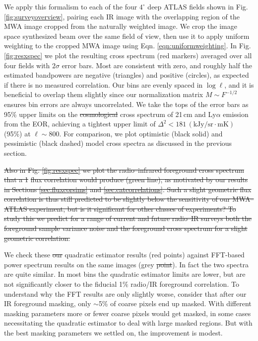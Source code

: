 \documentclass[numberedappendix]{emulateapj}
\providecommand{\DIFadd}[1]{{\protect\color{blue}\uwave{#1}}} %
\providecommand{\DIFdel}[1]{{\protect\color{red}\sout{#1}}}                      %
\providecommand{\DIFaddbegin}{} %
\providecommand{\DIFaddend}{} %
\providecommand{\DIFdelbegin}{} %
\providecommand{\DIFdelend}{} %
\begin{document}
We apply this formalism to each of the four $4^\circ$ deep ATLAS fields shown in Fig. \ref{fig:surveyoverview}, pairing each IR image with the overlapping region of the MWA image cropped from the naturally weighted image. We crop the image space synthesized beam over the same field of view, then use it to apply uniform weighting to the cropped MWA image using Eqn. \ref{eqn:uniformweighting}. In Fig. \ref{fig:resxspec} we plot the resulting cross spectrum (red markers) averaged over all four fields with $2\sigma$ error bars. Most are consistent with zero, and roughly half the estimated bandpowers are negative (triangles) and positive (circles), as expected if there is no measured correlation. Our bins are evenly spaced in $\log \ell$, and it is beneficial to overlap them slightly since our normalization matrix $M\sim F^{-1/2}$ ensures bin errors are always uncorrelated. We take the tops of the error bars as 95\% upper limits on the \DIFdelbegin \DIFdel{cosmological }\DIFdelend cross spectrum of \DIFaddbegin \DIFadd{residual foregrounds of  }\DIFaddend 21\,cm and Ly$\alpha$ emission from the EOR, achieving a tightest upper limit of $\Delta^2<181$\,$(\text{kJy/sr}\cdot \text{mK})$ (95\%) at $\ell\sim800$. For comparison, we plot optimistic (black solid) and pessimistic (black dashed) model cross spectra as discussed in the previous section.

\DIFdelbegin \DIFdel{Also in Fig. \ref{fig:resxspec} we plot the radio--infrared foreground cross spectrum that a 1}%
\DIFdel{flux correlation would produce (green line), as motivated by our results in Sections \ref{sec:fluxcorsims} and \ref{sec:catcorrelations}. Such a slight geometric flux correlation is thus still predicted to be slightly below the sensitivity of our MWA--ATLAS experiment, but is it significant for other classes of experiments? To study this we predict for a range of current and future radio--IR surveys both the foreground sample variance noise and the foreground cross spectrum for a slight geometric correlation. 
}%

\DIFdelend We check these \DIFdelbegin \DIFdel{our }\DIFdelend quadratic estimator results (red points) against FFT-based power spectrum results on the same images (grey \DIFdelbegin \DIFdel{point}\DIFdelend \DIFaddbegin \DIFadd{points}\DIFaddend ). In fact the two spectra are quite similar. In most bins the quadratic estimator limits are lower, but are not significantly closer to the fiducial 1\% radio/IR foreground correlation. To understand why the FFT results are only slightly worse, consider that after our IR foreground masking, only $\sim$5\% of coarse pixels end up masked. With different masking parameters more or fewer coarse pixels would get masked, in some cases necessitating the quadratic estimator to deal with large masked regions. But with the best masking parameters we settled on, the improvement is modest. 
\end{document}
